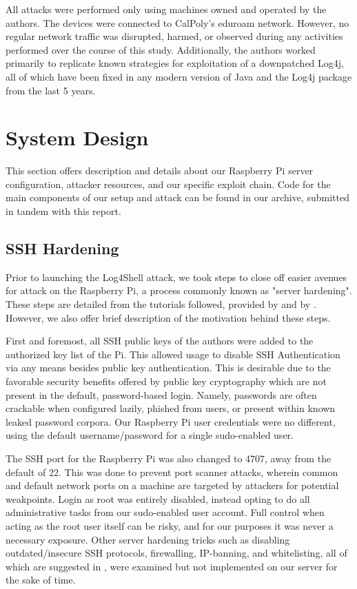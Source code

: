 \documentclass[sigconf]{acmart}
\begin{document}
All attacks were performed only using machines owned and operated by the authors. The devices were connected to
CalPoly's eduroam network. However, no regular network traffic was disrupted, harmed, or observed during any activities performed
over the course of this study. Additionally, the authors worked primarily to replicate known strategies for exploitation of a downpatched
Log4j, all of which have been fixed in any modern version of Java and the Log4j package from the last 5 years. 

\section{System Design}

This section offers description and details about our Raspberry Pi server configuration, attacker resources, and 
our specific exploit chain. Code for the main components of our setup and attack can be found in our archive, submitted
in tandem with this report. 

\subsection{SSH Hardening}

Prior to launching the Log4Shell attack, we took steps to close off easier avenues for attack on the Raspberry Pi, a
process commonly known as "server hardening". These steps are detailed from the tutorials followed, provided by \cite{sshKeys} and
by \cite{sshHardening}. However, we also offer brief description of the motivation behind these steps.

First and foremost, all SSH public keys of the authors were added to the authorized key list of the Pi. This allowed usage
to disable SSH Authentication via any means besides public key authentication. This is desirable due to the favorable 
security benefits offered by public key cryptography which are not present in the default, password-based login. Namely,
passwords are often crackable when configured lazily, phished from users, or present within known leaked password corpora. 
Our Raspberry Pi user credentials were no different, using the default username/password for a single sudo-enabled user.

The SSH port for the Raspberry Pi was also changed to 4707, away from the default of 22. This was done to prevent  
port scanner attacks, wherein common and default network ports on a machine are targeted by attackers for potential weakpoints.
Login as root was entirely disabled, instead opting to do all administrative tasks from our sudo-enabled user account. 
Full control when acting as the root user itself can be risky, and for our purposes it was never a necessary exposure.
Other server hardening tricks such as disabling outdated/insecure SSH protocols, firewalling, IP-banning, and whitelisting,
all of which are suggested in \cite{sshHardening}, were examined but not implemented on our server for the sake of time.
\end{document}
